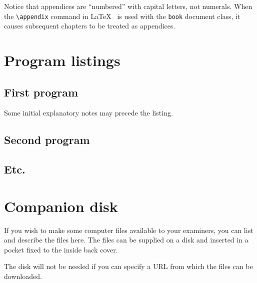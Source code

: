 \documentclass[12pt,openany,a4paper]{book}
\begin{document}
Notice that appendices are ``numbered'' with capital letters, not
numerals.  When the \verb+\appendix+ command in
\LaTeX~\cite[p.\,175]{lamport} is used with the \texttt{book} document
class, it causes subsequent chapters to be treated as appendices.

\chapter{Program listings}

\section{First program}

Some initial explanatory notes may precede the listing.

\section{Second program}

\section{Etc.}

\chapter{Companion disk}

If you wish to make some computer files available to your examiners,
you can list and describe the files here.  The files can be supplied
on a disk and inserted in a pocket fixed to the inside back cover.

The disk will not be needed if you can specify a URL from which the
files can be downloaded.

\cleardoublepage
\end{document}
